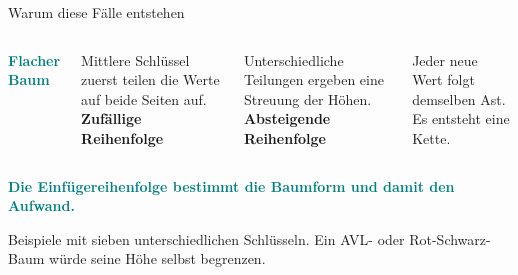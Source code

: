 \begin{frame}{Warum diese Fälle entstehen}
\begin{columns}[T,onlytextwidth]
\centering\textcolor{Teal}{\textbf{Flacher Baum}}\par\smallskip
\begin{minipage}[c][2.9cm][c]{\linewidth}\centering
{}
\end{minipage}
\par\small Mittlere Schlüssel zuerst teilen die Werte auf beide Seiten auf.
\centering\textbf{Zufällige Reihenfolge}\par\smallskip
\begin{minipage}[c][2.9cm][c]{\linewidth}\centering
{}
\end{minipage}
\par\small Unterschiedliche Teilungen ergeben eine Streuung der Höhen.
\centering\textcolor{Amber}{\textbf{Absteigende Reihenfolge}}\par\smallskip
\begin{minipage}[c][2.9cm][c]{\linewidth}\centering
{}
\end{minipage}
\par\small Jeder neue Wert folgt demselben Ast. Es entsteht eine Kette.
\end{columns}
\vspace{.35cm}
\textcolor{Teal}{\textbf{Die Einfügereihenfolge bestimmt die Baumform und damit den Aufwand.}}
\par\smallskip\scriptsize Beispiele mit sieben unterschiedlichen Schlüsseln. Ein AVL- oder Rot-Schwarz-Baum würde seine Höhe selbst begrenzen.

\end{frame}
